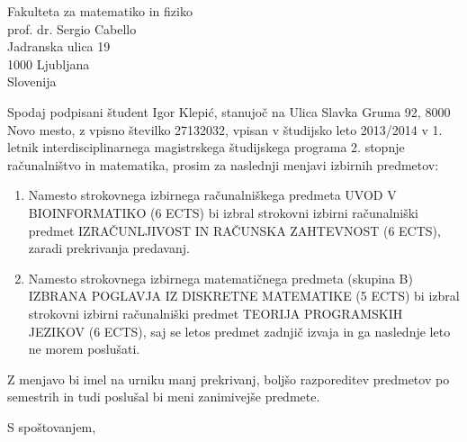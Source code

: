 \documentclass[a4paper]{scrlttr2}
\begin{document}
 
\begin{letter}{Fakulteta za matematiko in fiziko\\ prof. dr. Sergio Cabello \\ Jadranska ulica 19 \\ 1000 Ljubljana \\ Slovenija}
 

\opening{}
 
Spodaj podpisani študent Igor Klepić, stanujoč na Ulica Slavka Gruma 92, 8000 Novo mesto, z vpisno številko 27132032, vpisan v študijsko leto 2013/2014 v 1. letnik interdisciplinarnega magistrskega študijskega programa 2. stopnje računalništvo in matematika, prosim za naslednji menjavi izbirnih predmetov:
\begin{enumerate}
	\item Namesto strokovnega izbirnega računalniškega predmeta UVOD V BIOINFORMATIKO (6 ECTS) bi izbral strokovni izbirni računalniški predmet IZRAČUNLJIVOST IN RAČUNSKA ZAHTEVNOST (6 ECTS), zaradi prekrivanja predavanj.
	\item Namesto strokovnega izbirnega matematičnega predmeta (skupina B) IZBRANA POGLAVJA IZ DISKRETNE MATEMATIKE (5 ECTS) bi izbral strokovni izbirni računalniški predmet TEORIJA PROGRAMSKIH JEZIKOV (6 ECTS), saj se letos predmet zadnjič izvaja in ga naslednje leto ne morem poslušati.
\end{enumerate}

Z menjavo bi imel na urniku manj prekrivanj, boljšo razporeditev predmetov po semestrih in tudi poslušal bi meni zanimivejše predmete. 

\closing{S spoštovanjem,}




 
\end{letter}
 
\end{document}
